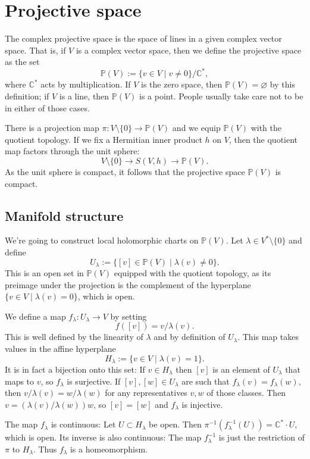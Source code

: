 \documentclass[11pt]{article}
\newcommand{\kk}[1]{\mathbb{#1}}
\begin{document}
\section{Projective space}
\label{sec:orgcfabeed}

The complex projective space is the space of lines in a given complex vector space. That is, if $V$ is a complex vector space, then we define the projective space as the set
$$
\kk P(V) := \{ v \in V \mid v \not= 0 \} / \kk C^*,
$$
where $\kk C^*$ acts by multiplication. If $V$ is the zero space, then $\kk P(V) = \varnothing$ by this definition; if $V$ is a line, then $\kk P(V)$ is a point. People usually take care not to be in either of those cases.

There is a projection map $\pi : V \setminus \{0\} \to \kk P(V)$ and we equip $\kk P(V)$ with the quotient topology. If we fix a Hermitian inner product $h$ on $V$, then the quotient map factors through the unit sphere:
$$
V \setminus \{0\} \to S(V, h) \to \kk P(V).
$$
As the unit sphere is compact, it follows that the projective space $\kk P(V)$ is compact.


\subsection{Manifold structure}

We're going to construct local holomorphic charts on $\kk P(V)$. Let $\lambda \in V^* \setminus \{0\}$ and define
$$
U_\lambda := \{ [v] \in \kk P(V) \mid \lambda(v) \not= 0 \}.
$$
This is an open set in $\kk P(V)$ equipped with the quotient topology, as its preimage under the projection is the complement of the hyperplane $\{v \in V \mid \lambda(v) = 0\}$, which is open.

We define a map $f_\lambda: U_\lambda \to V$ by setting
$$
f([v]) = v/\lambda(v).
$$
This is well defined by the linearity of $\lambda$ and by definition of $U_\lambda$. This map takes values in the affine hyperplane
$$
H_\lambda := \{ v \in V \mid \lambda(v) = 1 \}.
$$
It is in fact a bijection onto this set: If $v \in H_\lambda$ then $[v]$ is an element of $U_\lambda$ that maps to $v$, so $f_\lambda$ is surjective. If $[v], [w] \in U_\lambda$ are such that $f_\lambda(v) = f_\lambda(w)$, then $v/\lambda(v) = w/\lambda(w)$ for any representatives $v, w$ of those classes. Then $v = (\lambda(v)/\lambda(w)) w$, so $[v] = [w]$ and $f_\lambda$ is injective.

The map $f_\lambda$ is continuous: Let $U \subset H_\lambda$ be open. Then $\pi^{-1}(f_\lambda^{-1}(U)) = \kk C^* \cdot U$, which is open. Its inverse is also continuous: The map $f_\lambda^{-1}$ is just the restriction of $\pi$ to $H_\lambda$. Thus $f_\lambda$ is a homeomorphism.
\end{document}
